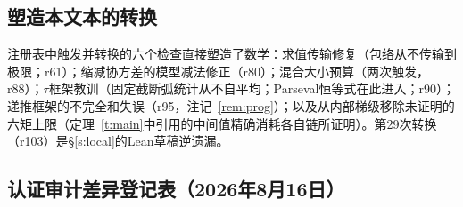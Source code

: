 \documentclass[11pt]{article}
\numberwithin{equation}{section}
\theoremstyle{definition}
\theoremstyle{remark}
\begin{document}
\subsection*{塑造本文本的转换}

注册表中触发并转换的六个检查直接塑造了数学：求值传输修复（包络从不传输到极限；r61）；缩减协方差的模型减法修正（r80）；混合大小预算（两次触发，r88）；$\tau$框架教训（固定截断弧统计从不自平均；Parseval恒等式在此进入；r90）；递推框架的不完全和失误（r95，注记~\ref{rem:prog}）；以及从内部梯级移除未证明的六矩上限（定理~\ref{t:main}中引用的中间值精确消耗各自链所证明）。第29次转换（r103）是\S\ref{s:local}的Lean草稿逆遗漏。

\subsection*{认证审计差异登记表（2026年8月16日）}
\end{document}

